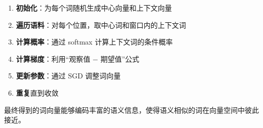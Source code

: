 \begin{enumerate}
    \item \textbf{初始化}：为每个词随机生成中心向量和上下文向量
    \item \textbf{遍历语料}：对每个位置，取中心词和窗口内的上下文词
    \item \textbf{计算概率}：通过 softmax 计算上下文词的条件概率
    \item \textbf{计算梯度}：利用``观察值 $-$ 期望值''公式
    \item \textbf{更新参数}：通过 SGD 调整词向量
    \item \textbf{重复}直到收敛
\end{enumerate}

最终得到的词向量能够编码丰富的语义信息，使得语义相似的词在向量空间中彼此接近。


